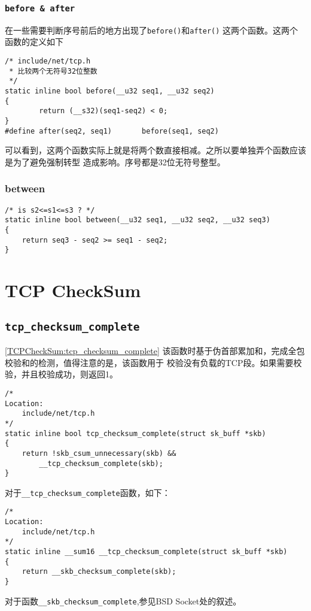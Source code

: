         \subsubsection{\texttt{before & after}}
            在一些需要判断序号前后的地方出现了\texttt{before()}和\texttt{after()}
            这两个函数。这两个函数的定义如下
\begin{verbatim}
/* include/net/tcp.h
 * 比较两个无符号32位整数
 */
static inline bool before(__u32 seq1, __u32 seq2)
{
        return (__s32)(seq1-seq2) < 0;
}
#define after(seq2, seq1)       before(seq1, seq2)
\end{verbatim}
        可以看到，这两个函数实际上就是将两个数直接相减。之所以要单独弄个函数应该是为了避免强制转型
        造成影响。序号都是32位无符号整型。
        \subsubsection{between}

\begin{verbatim}
/* is s2<=s1<=s3 ? */
static inline bool between(__u32 seq1, __u32 seq2, __u32 seq3)
{
    return seq3 - seq2 >= seq1 - seq2;
}
\end{verbatim}

\section{TCP CheckSum}
    \subsection{\texttt{tcp_checksum_complete}}
            \ref{TCPCheckSum:tcp_checksum_complete}
            该函数时基于伪首部累加和，完成全包校验和的检测，值得注意的是，该函数用于
            校验没有负载的TCP段。如果需要校验，并且校验成功，则返回1。
\begin{verbatim}
/*
Location:
    include/net/tcp.h
*/
static inline bool tcp_checksum_complete(struct sk_buff *skb)
{
    return !skb_csum_unnecessary(skb) &&
        __tcp_checksum_complete(skb);
}
\end{verbatim}
            对于\texttt{__tcp_checksum_complete}函数，如下：
\begin{verbatim}
/*
Location:
    include/net/tcp.h
*/
static inline __sum16 __tcp_checksum_complete(struct sk_buff *skb)
{
    return __skb_checksum_complete(skb);
}
\end{verbatim}
            对于函数\texttt{__skb_checksum_complete},参见BSD Socket处的叙述。

